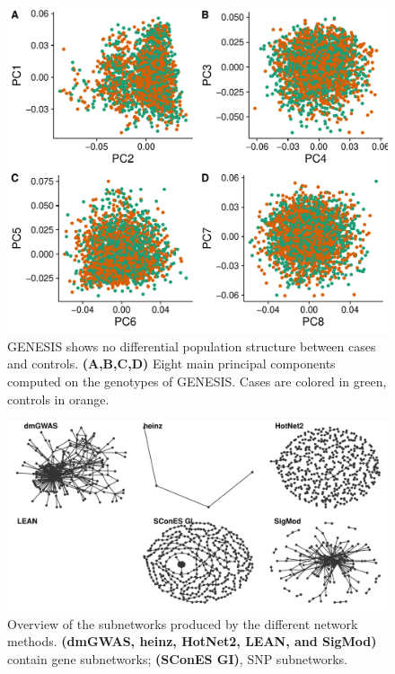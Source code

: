 \documentclass[twocolumn, 10pt]{article}
\begin{document}
\begin{figure}[htbp]
\centering
\includegraphics[width=.9\linewidth]{./figures/sfigure_1.pdf}
\caption{\label{sfig:pcs}
GENESIS shows no differential population structure between cases and controls. \textbf{(A,B,C,D)} Eight main principal components computed on the genotypes of GENESIS. Cases are colored in green, controls in orange.}
\end{figure}

\begin{figure}[htbp]
\centering
\includegraphics[width=.9\linewidth]{./figures/sfigure_2.pdf}
\caption{\label{sfig:overview_solutions}
Overview of the subnetworks produced by the different network methods. \textbf{(dmGWAS, heinz, HotNet2, LEAN, and SigMod)} contain gene subnetworks; \textbf{(SConES GI)}, SNP subnetworks.}
\end{figure}
\end{document}
